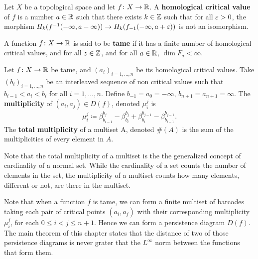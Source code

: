 \begin{definition}
    Let $ X $ be a topological space and let $ f\colon X \to \mathbb R $. A {\bf homological critical value} of $ f $ is   a number $ a \in \mathbb R $ such that there exists $k \in \mathbb Z$ such that for all 
    $ \varepsilon > 0 $, the morphism $ H_k(f^{-1}(-\infty, a - \infty)) \to H_k(f_{-1}(-\infty, a + \varepsilon)) $ is not an isomorphism.
\end{definition}

\begin{definition} \label{def:tame-function}
    A function $ f\colon X \to \mathbb R $ is said to be {\bf tame} if it has a finite number of homological critical values, and for all $ z \in \mathbb Z $, and for all $ a \in \mathbb R $, $ \dim F_a < \infty $.
\end{definition}

\begin{definition}[Multiplicity]
    Let $f \colon X \to \mathbb R $ be tame, and $ (a_i)_{i = 1, \dots, n} $ be its homological critical values. Take $ (b_i)_{i = 1, \dots, n} $ be an interleaved sequence of non critical values such that $ b_{i-1} < a_i < b_i $ for all $ i = 1, \dots, n $. Define $ b_{-1} = a_0 = -\infty $, $b_{n+1} = a_{n+1} = \infty $. The {\bf multiplicity} of $ (a_i, a_j) \in D(f) $, denoted $ \mu_i^j $ is
    \begin{align}
        \mu_i^j \coloneq \beta_{b_{i-1}}^{b_j} - \beta_{b_{i}}^{b_j} + \beta_{b_{i}}^{b_{j-1}} - \beta_{b_{i-1}}^{b_{j-1}}.
    \end{align}
    The {\bf total multiplicity} of a multiset A, denoted $ \#(A) $ is the sum of the multiplicities of every element in $A$.
\end{definition}

Note that the total multiplicity of a multiset is the the generalized concept of cardinality of a normal set. While the cardinality of a set counts the number of elements in the set, the multiplicity of a multiset counts how many elements, different or not, are there in the multiset.

Note that when a function $ f $ is tame, we can form a finite multiset of barcodes taking each pair of critical points $ (a_i, a_j) $ with their corresponding multiplicity $ \mu_i^j $, for each $ 0 \leq i < j \leq n+ 1 $. Hence we can form a persistence diagram $ D(f) $. The main theorem of this chapter states that the distance of two of those persistence diagrams is never grater that the $L^\infty $ norm between the functions that form them.

